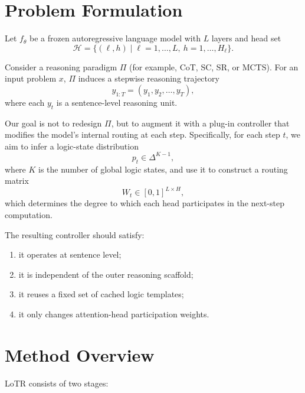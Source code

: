 \documentclass[11pt]{article}
\begin{document}
\section{Problem Formulation}

Let $f_\theta$ be a frozen autoregressive language model with $L$ layers and head set
\[
\mathcal{H} = \{(\ell,h)\mid \ell=1,\dots,L,\ h=1,\dots,H_\ell\}.
\]

Consider a reasoning paradigm $\Pi$ (for example, CoT, SC, SR, or MCTS). For an input problem $x$, $\Pi$ induces a stepwise reasoning trajectory
\[
y_{1:T} = (y_1, y_2, \dots, y_T),
\]
where each $y_t$ is a sentence-level reasoning unit.

Our goal is not to redesign $\Pi$, but to augment it with a plug-in controller that modifies the model's internal routing at each step. Specifically, for each step $t$, we aim to infer a logic-state distribution
\[
p_t \in \Delta^{K-1},
\]
where $K$ is the number of global logic states, and use it to construct a routing matrix
\[
W_t \in [0,1]^{L\times H},
\]
which determines the degree to which each head participates in the next-step computation.

The resulting controller should satisfy:
\begin{enumerate}[leftmargin=1.5em]
    \item it operates at sentence level;
    \item it is independent of the outer reasoning scaffold;
    \item it reuses a fixed set of cached logic templates;
    \item it only changes attention-head participation weights.
\end{enumerate}

\section{Method Overview}

LoTR consists of two stages:
\end{document}
